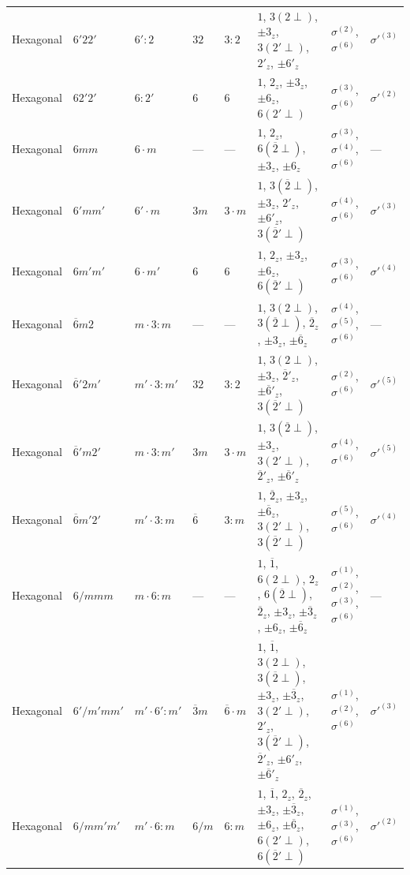 \documentclass[a4paper,11pt]{article}
\newcommand{\ob}[1]{\overline{#1}}
\newcommand{\sg}[1]{\sigma^{(#1)}}
\newcommand{\sgp}[1]{\sigma'^{(#1)}}
\begin{document}
\begin{landscape}
\begin{longtable}{l l l l l p{9.5cm} l l}
Hexagonal & $6'22'$ & $6'{:}2$ & $32$ & $3{:}2$ & $1$, $3(2{\perp})$, $\pm 3_z$, $3(2'{\perp})$, $2'_z$, $\pm 6'_z$ & $\sg{2}$, $\sg{6}$ & $\sgp{3}$ \\
Hexagonal & $62'2'$ & $6{:}2'$ & $6$ & $6$ & $1$, $2_z$, $\pm 3_z$, $\pm 6_z$, $6(2'{\perp})$ & $\sg{3}$, $\sg{6}$ & $\sgp{2}$ \\
Hexagonal & $6mm$ & $6{\cdot}m$ & --- & --- & $1$, $2_z$, $6(\ob{2}{\perp})$, $\pm 3_z$, $\pm 6_z$ & $\sg{3}$, $\sg{4}$, $\sg{6}$ & --- \\
Hexagonal & $6'mm'$ & $6'{\cdot}m$ & $3m$ & $3{\cdot}m$ & $1$, $3(\ob{2}{\perp})$, $\pm 3_z$, $2'_z$, $\pm 6'_z$, $3(\ob{2}'{\perp})$ & $\sg{4}$, $\sg{6}$ & $\sgp{3}$ \\
Hexagonal & $6m'm'$ & $6{\cdot}m'$ & $6$ & $6$ & $1$, $2_z$, $\pm 3_z$, $\pm 6_z$, $6(\ob{2}'{\perp})$ & $\sg{3}$, $\sg{6}$ & $\sgp{4}$ \\
Hexagonal & $\ob{6}m2$ & $m{\cdot}3{:}m$ & --- & --- & $1$, $3(2{\perp})$, $3(\ob{2}{\perp})$, $\ob{2}_z$, $\pm 3_z$, $\pm\ob{6}_z$ & $\sg{4}$, $\sg{5}$, $\sg{6}$ & --- \\
Hexagonal & $\ob{6}'2m'$ & $m'{\cdot}3{:}m'$ & $32$ & $3{:}2$ & $1$, $3(2{\perp})$, $\pm 3_z$, $\ob{2}'_z$, $\pm\ob{6}'_z$, $3(\ob{2}'{\perp})$ & $\sg{2}$, $\sg{6}$ & $\sgp{5}$ \\
Hexagonal & $\ob{6}'m2'$ & $m{\cdot}3{:}m'$ & $3m$ & $3{\cdot}m$ & $1$, $3(\ob{2}{\perp})$, $\pm 3_z$, $3(2'{\perp})$, $\ob{2}'_z$, $\pm\ob{6}'_z$ & $\sg{4}$, $\sg{6}$ & $\sgp{5}$ \\
Hexagonal & $\ob{6}m'2'$ & $m'{\cdot}3{:}m$ & $\ob{6}$ & $3{:}m$ & $1$, $\ob{2}_z$, $\pm 3_z$, $\pm\ob{6}_z$, $3(2'{\perp})$, $3(\ob{2}'{\perp})$ & $\sg{5}$, $\sg{6}$ & $\sgp{4}$ \\
Hexagonal & $6/mmm$ & $m{\cdot}6{:}m$ & --- & --- & $1$, $\ob{1}$, $6(2{\perp})$, $2_z$, $6(\ob{2}{\perp})$, $\ob{2}_z$, $\pm 3_z$, $\pm\ob{3}_z$, $\pm 6_z$, $\pm\ob{6}_z$ & $\sg{1}$, $\sg{2}$, $\sg{3}$, $\sg{6}$ & --- \\
Hexagonal & $6'/m'mm'$ & $m'{\cdot}6'{:}m'$ & $\ob{3}m$ & $\ob{6}{\cdot}m$ & $1$, $\ob{1}$, $3(2{\perp})$, $3(\ob{2}{\perp})$, $\pm 3_z$, $\pm\ob{3}_z$, $3(2'{\perp})$, $2'_z$, $3(\ob{2}'{\perp})$, $\ob{2}'_z$, $\pm 6'_z$, $\pm\ob{6}'_z$ & $\sg{1}$, $\sg{2}$, $\sg{6}$ & $\sgp{3}$ \\
Hexagonal & $6/mm'm'$ & $m'{\cdot}6{:}m$ & $6/m$ & $6{:}m$ & $1$, $\ob{1}$, $2_z$, $\ob{2}_z$, $\pm 3_z$, $\pm\ob{3}_z$, $\pm 6_z$, $\pm\ob{6}_z$, $6(2'{\perp})$, $6(\ob{2}'{\perp})$ & $\sg{1}$, $\sg{3}$, $\sg{6}$ & $\sgp{2}$ \\

\end{longtable}
\end{landscape}
\end{document}
